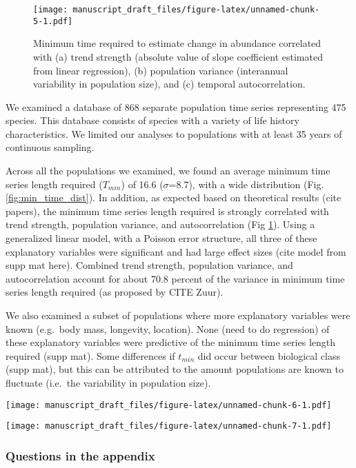 \documentclass[12pt,]{article}
\begin{document}
\begin{figure}[htbp]
\centering
\texttt{[image: manuscript\_draft\_files/figure-latex/unnamed-chunk-5-1.pdf]}
\caption{Minimum time required to estimate change in abundance
correlated with (a) trend strength (absolute value of slope coefficient
estimated from linear regression), (b) population variance (interannual
variability in population size), and (c) temporal
autocorrelation.\label{fig:correlates}}
\end{figure}

We examined a database of 868 separate population time series
representing 475 species. This database consists of species with a
variety of life history characteristics. We limited our analyses to
populations with at least 35 years of continuous sampling.

Across all the populations we examined, we found an average minimum time
series length required (\(T_{min}\)) of 16.6 (\(\sigma\)=8.7), with a
wide distribution (Fig. \ref{fig:min_time_dist}). In addition, as
expected based on theoretical results (cite papers), the minimum time
series length required is strongly correlated with trend strength,
population variance, and autocorrelation (Fig \ref{fig:correlates}).
Using a generalized linear model, with a Poisson error structure, all
three of these explanatory variables were significant and had large
effect sizes (cite model from supp mat here). Combined trend strength,
population variance, and autocorrelation account for about 70.8 percent
of the variance in minimum time series length required (as proposed by
CITE Zuur).

We also examined a subset of populations where more explanatory
variables were known (e.g.~body mass, longevity, location). None (need
to do regression) of these explanatory variables were predictive of the
minimum time series length required (supp mat). Some differences if
\(t_{min}\) did occur between biological class (supp mat), but this can
be attributed to the amount populations are known to fluctuate (i.e.~the
variability in population size).

\texttt{[image: manuscript\_draft\_files/figure-latex/unnamed-chunk-6-1.pdf]}

\texttt{[image: manuscript\_draft\_files/figure-latex/unnamed-chunk-7-1.pdf]}

\subsubsection{Questions in the
appendix}\label{questions-in-the-appendix}
\end{document}
